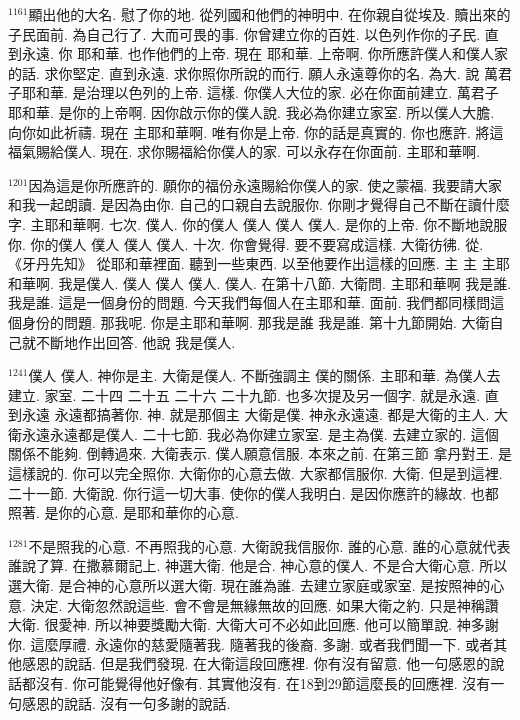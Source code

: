 \documentclass{book}
\begin{document}
$^{1161}$顯出他的大名.
慰了你的地.
從列國和他們的神明中.
在你親自從埃及.
贖出來的子民面前.
為自己行了.
大而可畏的事.
你曾建立你的百姓.
以色列作你的子民.
直到永遠.
你 耶和華.
也作他們的上帝.
現在 耶和華.
上帝啊.
你所應許僕人和僕人家的話.
求你堅定.
直到永遠.
求你照你所說的而行.
願人永遠尊你的名.
為大.
說 萬君子耶和華.
是治理以色列的上帝.
這樣.
你僕人大位的家.
必在你面前建立.
萬君子耶和華.
是你的上帝啊.
因你啟示你的僕人說.
我必為你建立家室.
所以僕人大膽.
向你如此祈禱.
現在 主耶和華啊.
唯有你是上帝.
你的話是真實的.
你也應許.
將這福氣賜給僕人.
現在.
求你賜福給你僕人的家.
可以永存在你面前.
主耶和華啊.

$^{1201}$因為這是你所應許的.
願你的福份永遠賜給你僕人的家.
使之蒙福.
我要請大家和我一起朗讀.
是因為由你.
自己的口親自去說服你.
你剛才覺得自己不斷在讀什麼字.
主耶和華啊.
七次.
僕人.
你的僕人 僕人 僕人 僕人.
是你的上帝.
你不斷地說服你.
你的僕人 僕人 僕人 僕人.
十次.
你會覺得.
要不要寫成這樣.
大衛彷彿.
從.
《牙丹先知》 從耶和華裡面.
聽到一些東西.
以至他要作出這樣的回應.
主 主 主耶和華啊.
我是僕人.
僕人 僕人 僕人.
僕人.
在第十八節.
大衛問.
主耶和華啊 我是誰.
我是誰.
這是一個身份的問題.
今天我們每個人在主耶和華.
面前.
我們都同樣問這個身份的問題.
那我呢.
你是主耶和華啊.
那我是誰 我是誰.
第十九節開始.
大衛自己就不斷地作出回答.
他說 我是僕人.

$^{1241}$僕人 僕人.
神你是主.
大衛是僕人.
不斷強調主 僕的關係.
主耶和華.
為僕人去建立.
家室.
二十四 二十五 二十六 二十九節.
也多次提及另一個字.
就是永遠.
直到永遠 永遠都搞著你.
神.
就是那個主 大衛是僕.
神永永遠遠.
都是大衛的主人.
大衛永遠永遠都是僕人.
二十七節.
我必為你建立家室.
是主為僕.
去建立家的.
這個關係不能夠.
倒轉過來.
大衛表示.
僕人願意信服.
本來之前.
在第三節 拿丹對王.
是這樣說的.
你可以完全照你.
大衛你的心意去做.
大家都信服你.
大衛.
但是到這裡.
二十一節.
大衛說.
你行這一切大事.
使你的僕人我明白.
是因你應許的緣故.
也都照著.
是你的心意.
是耶和華你的心意.

$^{1281}$不是照我的心意.
不再照我的心意.
大衛說我信服你.
誰的心意.
誰的心意就代表誰說了算.
在撒慕爾記上.
神選大衛.
他是合.
神心意的僕人.
不是合大衛心意.
所以選大衛.
是合神的心意所以選大衛.
現在誰為誰.
去建立家庭或家室.
是按照神的心意.
決定.
大衛忽然說這些.
會不會是無緣無故的回應.
如果大衛之約.
只是神稱讚大衛.
很愛神.
所以神要獎勵大衛.
大衛大可不必如此回應.
他可以簡單說.
神多謝你.
這麼厚禮.
永遠你的慈愛隨著我.
隨著我的後裔.
多謝.
或者我們聞一下.
或者其他感恩的說話.
但是我們發現.
在大衛這段回應裡.
你有沒有留意.
他一句感恩的說話都沒有.
你可能覺得他好像有.
其實他沒有.
在18到29節這麼長的回應裡.
沒有一句感恩的說話.
沒有一句多謝的說話.
\end{document}
